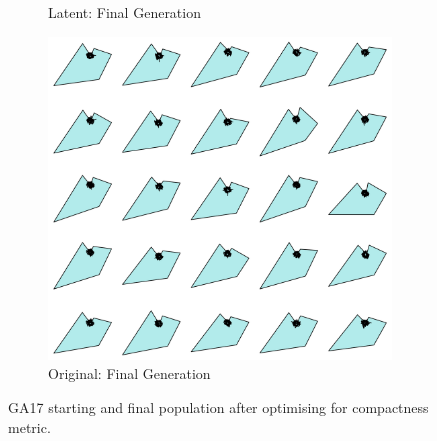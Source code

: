 \documentclass{article}
\begin{document}
\begin{figure}[H]
\begin{subfigure}[b]{0.32\textwidth}
        \caption{Latent: Final Generation}
        \label{fig:GA17_final}
    \end{subfigure}
    \hfill
    \begin{subfigure}[b]{0.32\textwidth}
        \centering
        \includegraphics[width=\textwidth]{figures/GAResults/GA17/original/original_final_gen.png}
        \caption{Original: Final Generation}
        \label{fig:GA17_final}
    \end{subfigure}
    \caption{GA17 starting and final population after optimising for compactness metric.}
    \label{fig:GA17_before_after_GA}
\end{figure}
\end{document}
